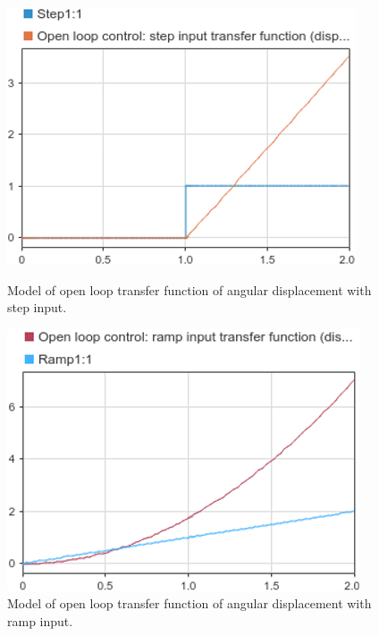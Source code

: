 \documentclass[conference]{IEEEtran}
\begin{document}
\begin{figure}[htbp]
    \centering
    \begin{minipage}[b]{0.24\textwidth}
      \includegraphics[width=\textwidth]{../img/q1-9.png}
      \caption{Model of open loop transfer function of angular displacement with step input.}
      \label{oltad2}
    \end{minipage}
    \hfill
    \begin{minipage}[b]{0.24\textwidth}
      \includegraphics[width=\textwidth]{../img/q1-10.png}
      \caption{Model of open loop transfer function of angular displacement with ramp input.}
      \label{oltad3}
    \end{minipage}
\end{figure}
\end{document}
